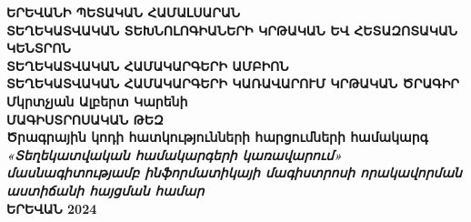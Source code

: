 \begin{titlepage}
    \begin{center}
        \linespread{1.3}
        \vspace{0.5cm}
        {
            \fontsize{18}{0}
            \textbf{ԵՐԵՎԱՆԻ ՊԵՏԱԿԱՆ ՀԱՄԱԼՍԱՐԱՆ} \\
        }
        \vspace{1cm}
        {
            \fontsize{18}{0}
            \textbf{ՏԵՂԵԿԱՏՎԱԿԱՆ ՏԵԽՆՈԼՈԳԻԱՆԵՐԻ ԿՐԹԱԿԱՆ ԵՎ ՀԵՏԱԶՈՏԱԿԱՆ ԿԵՆՏՐՈՆ} \\
        }
        \vspace{1cm}
        {
            \fontsize{16}{0}
            \textbf{ՏԵՂԵԿԱՏՎԱԿԱՆ ՀԱՄԱԿԱՐԳԵՐԻ ԱՄԲԻՈՆ} \\
        }
        \vspace{1cm}
        {
            \fontsize{18}{0}
            \textbf{ՏԵՂԵԿԱՏՎԱԿԱՆ ՀԱՄԱԿԱՐԳԵՐԻ ԿԱՌԱՎԱՐՈՒՄ ԿՐԹԱԿԱՆ ԾՐԱԳԻՐ} \\
        }
        \vspace{2cm}
        {
            \fontsize{18}{0}
            \textbf{Մկրտչյան Ալբերտ Կարենի} \\
        }
        \vspace{1.5cm}
        {
            \fontsize{18}{0}
            \textbf{ՄԱԳԻՍՏՐՈՍԱԿԱՆ ԹԵԶ} \\
        }
        \vspace{1cm}
        {
            \fontsize{16}{0}
            \textbf{Ծրագրային կոդի հատկությունների հարցումների համակարգ} \\
        }
        \vfill
        {
            \fontsize{14}{0}
            \textbf{\textit{«Տեղեկատվական համակարգերի կառավարում» մասնագիտությամբ ինֆորմատիկայի մագիստրոսի որակավորման աստիճանի հայցման համար}} \\
        }
        \vspace{1cm}
        {
            \fontsize{13}{0}
            \textbf{ԵՐԵՎԱՆ 2024} \\
        }
    \end{center}
\end{titlepage}